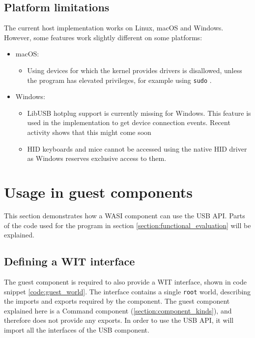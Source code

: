 \subsection{Platform limitations}
The current host implementation works on Linux, macOS and Windows. However, some features work slightly different on some platforms:

\begin{itemize}
\item macOS: 
\begin{itemize}
\item Using devices for which the kernel provides drivers is disallowed, unless the program has elevated privileges, for example using \texttt{sudo} \cite{libusb_macos_limitations}.
\end{itemize}

\item Windows:
\begin{itemize}
\item LibUSB hotplug support is currently missing for Windows. This feature is used in the implementation to get device connection events. Recent activity shows that this might come soon \cite{libusb_hotplug_support}
\item HID keyboards and mice cannot be accessed using the native HID driver as Windows reserves exclusive access to them. \cite{libusb_windows_limitations}
\end{itemize}
\end{itemize}

\section{Usage in guest components}
This section demonstrates how a \acrshort{WASI} component can use the \acrshort{USB} \acrshort{API}. Parts of the code used for the program in section \ref{section:functional_evaluation} will be explained.

\subsection{Defining a \acrshort{WIT} interface}
The guest component is required to also provide a \acrshort{WIT} interface, shown in code snippet \ref{code:guest_world}. The interface contains a single \texttt{root} world, describing the imports and exports required by the component. The guest component explained here is a Command component (\ref{section:component_kinds}), and therefore does not provide any exports. In order to use the \acrshort{USB} \acrshort{API}, it will import all the interfaces of the \acrshort{USB} component.\\

